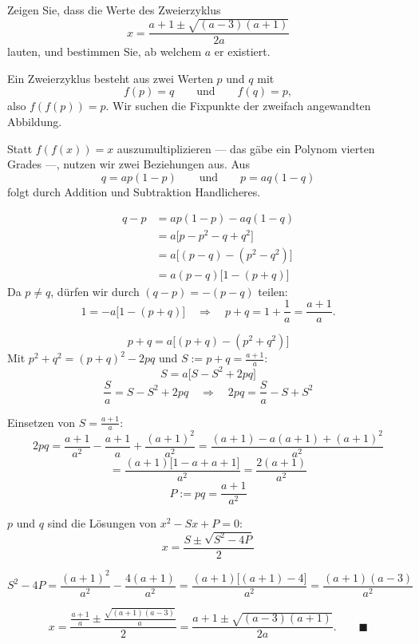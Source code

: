 \begin{aufgabe}
Zeigen Sie, dass die Werte des Zweierzyklus
\[ x = \frac{a+1 \pm \sqrt{(a-3)(a+1)}}{2a} \]
lauten, und bestimmen Sie, ab welchem $a$ er existiert.

\loesung
{}
Ein Zweierzyklus besteht aus zwei Werten $p$ und $q$ mit
\[ f(p) = q \qquad\text{und}\qquad f(q) = p , \]
also $f(f(p)) = p$. Wir suchen die Fixpunkte der zweifach angewandten Abbildung.

Statt $f(f(x)) = x$ auszumultiplizieren --- das gäbe ein Polynom vierten Grades ---, nutzen wir zwei Beziehungen aus. Aus
\[ q = ap(1-p) \qquad\text{und}\qquad p = aq(1-q) \]
folgt durch Addition und Subtraktion Handlicheres.

\begin{align*}
q - p &= ap(1-p) - aq(1-q)\\
&= a\bigl[p - p^2 - q + q^2\bigr]\\
&= a\bigl[(p-q) - (p^2-q^2)\bigr]\\
&= a(p-q)\bigl[1 - (p+q)\bigr]
\end{align*}
Da $p \neq q$, dürfen wir durch $(q-p) = -(p-q)$ teilen:
\[ 1 = -a\bigl[1-(p+q)\bigr] \quad\Longrightarrow\quad p+q = 1 + \frac{1}{a} = \frac{a+1}{a} . \]

\[ p+q = a\bigl[(p+q) - (p^2+q^2)\bigr] \]
Mit $p^2+q^2 = (p+q)^2 - 2pq$ und $S := p+q = \frac{a+1}{a}$:
\[ S = a\bigl[S - S^2 + 2pq\bigr] \]
\[ \frac{S}{a} = S - S^2 + 2pq \quad\Longrightarrow\quad 2pq = \frac{S}{a} - S + S^2 \]

Einsetzen von $S = \frac{a+1}{a}$:
\[ 2pq = \frac{a+1}{a^2} - \frac{a+1}{a} + \frac{(a+1)^2}{a^2} = \frac{(a+1) - a(a+1) + (a+1)^2}{a^2} \]
\[ = \frac{(a+1)\bigl[1 - a + a + 1\bigr]}{a^2} = \frac{2(a+1)}{a^2} \]
\[ P := pq = \frac{a+1}{a^2} \]

$p$ und $q$ sind die Lösungen von $x^2 - Sx + P = 0$:
\[ x = \frac{S \pm \sqrt{S^2 - 4P}}{2} \]

\[ S^2 - 4P = \frac{(a+1)^2}{a^2} - \frac{4(a+1)}{a^2} = \frac{(a+1)\bigl[(a+1)-4\bigr]}{a^2} = \frac{(a+1)(a-3)}{a^2} \]

\[ x = \frac{\frac{a+1}{a} \pm \frac{\sqrt{(a+1)(a-3)}}{a}}{2} = \frac{a+1 \pm \sqrt{(a-3)(a+1)}}{2a} . \qquad \blacksquare \]


\end{aufgabe}
